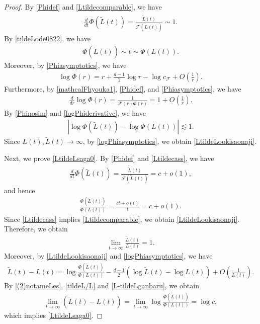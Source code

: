 \documentclass[reqno]{amsart}
\theoremstyle{plain}
\theoremstyle{definition}
\numberwithin{equation}{section}
\begin{document}
\begin{proof}
By \eqref{Phidef} and \eqref{Ltildecomparable}, we have
\begin{align}\label{tildeLode0822}
\frac{d}{dt}\Phi(\tilde{L}(t))=\frac{\dot{\tilde{L}}(t)}{\mathcal{F}(\tilde{L}(t))}\sim1.
\end{align}
By \eqref{tildeLode0822}, we have
\begin{align}\label{Phinosim}
\Phi(\tilde{L}(t))\sim t\sim \Phi(L(t)).
\end{align}
Moreover, by \eqref{Phiasymptotics}, we have
\begin{align}\label{logPhiasymptotics}
\log{\Phi(r)}=r+\frac{d-1}{2}\log{r}-\log{c_{\mathcal{F}}}+O\left(\frac{1}{r}\right).
\end{align}
Furthermore, by \eqref{mathcalFhyouka1}, \eqref{Phidef}, and \eqref{Phiasymptotics}, we have
\begin{align}\label{logPhiderivative}
\frac{d}{dr}\log{\Phi(r)}=\frac{1}{\mathcal{F}(r)\Phi(r)}=1+O\left(\frac{1}{r}\right).
\end{align}
By \eqref{Phinosim} and \eqref{logPhiderivative}, we have
\begin{align*}
\left|\log{\Phi(\tilde{L}(t))}-\log{\Phi(L(t))}\right|\lesssim1.
\end{align*}
Since $L(t),\tilde{L}(t)\to\infty$, by \eqref{logPhiasymptotics}, we obtain \eqref{LtildeLookisaonaji}.

Next, we prove \eqref{LtildeLsaga0}. By \eqref{Phidef} and \eqref{Ltildecass}, we have
\begin{align*}
\frac{d}{dt}\Phi(\tilde{L}(t))=\frac{\dot{\tilde{L}}(t)}{\mathcal{F}(\tilde{L}(t))}=c+o(1),
\end{align*}
and hence
\begin{align}\label{(2)notameLes}
\frac{\Phi(\tilde{L}(t))}{\Phi(L(t))}=\frac{ct+o(t)}{t}=c+o(1).
\end{align}
Since \eqref{Ltildecass} implies \eqref{Ltildecomparable}, we obtain \eqref{LtildeLookisaonaji}. Therefore, we obtain
\begin{align}\label{tildeL/L}
\lim_{t\to\infty}\frac{\tilde{L}(t)}{L(t)}=1.
\end{align}
Moreover, by \eqref{LtildeLookisaonaji} and \eqref{logPhiasymptotics}, we have
\begin{align}\label{L-tildeLganbaru}
\tilde{L}(t)-L(t)=\log{{\frac{\Phi(\tilde{L}(t))}{\Phi(L(t))}}}-\frac{d-1}{2}\left(\log{\tilde{L}(t)}-\log{L(t)}\right)+O\left(\frac{1}{L(t)}\right).
\end{align}
By \eqref{(2)notameLes}, \eqref{tildeL/L} and \eqref{L-tildeLganbaru}, we obtain
\begin{align*}
\lim_{t\to\infty}\left(\tilde{L}(t)-L(t)\right)=\lim_{t\to\infty}\log{\frac{\Phi(\tilde{L}(t))}{\Phi(L(t))}}=\log{c},
\end{align*}
which implies \eqref{LtildeLsaga0}.
\end{proof}
\end{document}
